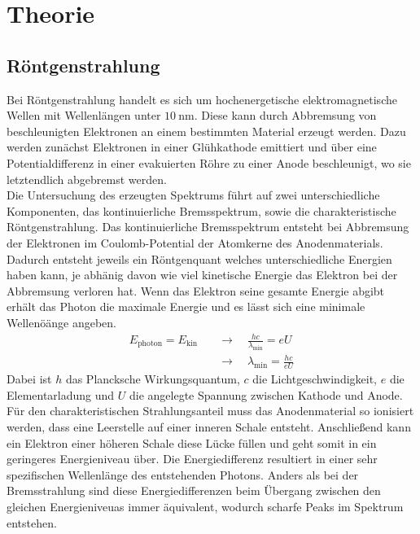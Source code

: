\section{Theorie}

\subsection{Röntgenstrahlung}
Bei Röntgenstrahlung handelt es sich um hochenergetische elektromagnetische Wellen mit Wellenlängen unter $\SI{10}{\nano\meter}$. Diese kann
durch Abbremsung von beschleunigten Elektronen an einem bestimmten Material erzeugt werden. Dazu werden zunächst Elektronen in einer Glühkathode emittiert und über
eine Potentialdifferenz in einer evakuierten Röhre zu einer Anode beschleunigt, wo sie letztendlich abgebremst werden.
\\
Die Untersuchung des erzeugten Spektrums führt auf zwei unterschiedliche Komponenten, das kontinuierliche Bremsspektrum, sowie die charakteristische Röntgenstrahlung.
Das kontinuierliche Bremsspektrum entsteht bei Abbremsung der Elektronen im Coulomb-Potential der Atomkerne des Anodenmaterials. Dadurch entsteht jeweils ein Röntgenquant welches
 unterschiedliche Energien haben kann, je abhänig davon wie viel kinetische Energie das Elektron bei der Abbremsung verloren hat. Wenn das Elektron seine gesamte
Energie abgibt erhält das Photon die maximale Energie und es lässt sich eine minimale Wellenöänge angeben.
\\
\begin{align}
\nonumber
E_{\text{photon}} = E_{\text{kin}} \quad &\to \quad \frac{hc}{\lambda_{\text{min}}} = e U \\
&\to \quad \lambda_{\text{min}} = \frac{hc}{eU}
\end{align}
Dabei ist $h$ das Plancksche Wirkungsquantum, $c$ die Lichtgeschwindigkeit, $e$ die Elementarladung und $U$ die angelegte Spannung zwischen Kathode und Anode.
\\
Für den charakteristischen Strahlungsanteil muss das Anodenmaterial so ionisiert werden, dass eine Leerstelle auf einer inneren Schale entsteht. Anschließend kann ein Elektron einer höheren Schale diese Lücke füllen und geht
somit in ein geringeres Energieniveau über. Die Energiedifferenz resultiert in einer sehr spezifischen Wellenlänge des entstehenden Photons. Anders als bei der Bremsstrahlung sind diese Energiedifferenzen beim Übergang zwischen den
gleichen Energieniveuas immer äquivalent, wodurch scharfe Peaks im Spektrum entstehen.
\\
